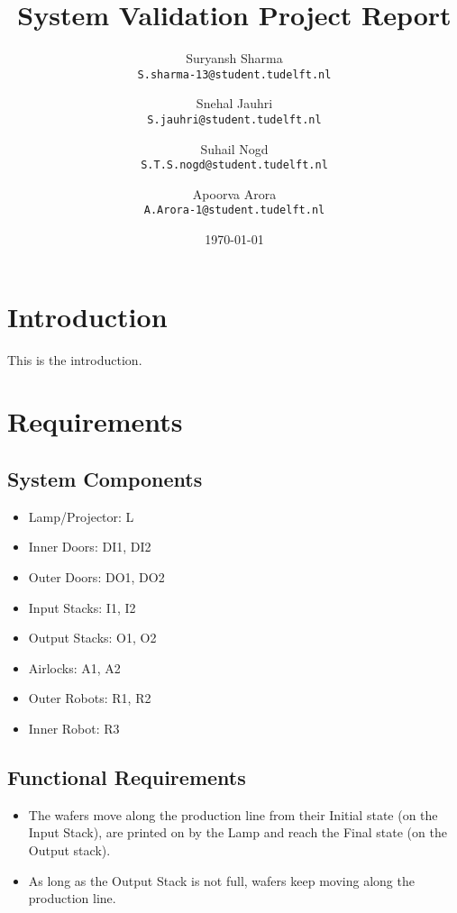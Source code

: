 \documentclass[a4paper,12pt]{article}
\begin{document}
\title{System Validation Project Report}
\author{
	Suryansh Sharma \\ 
	\texttt{S.sharma-13@student.tudelft.nl}
 	\and 
	Snehal Jauhri \\
	\texttt{S.jauhri@student.tudelft.nl} 
	\and
	Suhail Nogd \\
	\texttt{S.T.S.nogd@student.tudelft.nl} 	
	 \and 
	Apoorva Arora\\
	\texttt{A.Arora-1@student.tudelft.nl} 
}

\date {\today}
\maketitle

\section{Introduction}
This is the introduction.

\section{Requirements}

\subsection{System Components}
\begin{itemize}
\item Lamp/Projector: L
\item Inner Doors: DI1, DI2
\item Outer Doors: DO1, DO2
\item Input Stacks: I1, I2
\item Output Stacks: O1, O2
\item Airlocks: A1, A2
\item Outer Robots: R1, R2
\item Inner Robot: R3
\end{itemize}

\subsection{Functional Requirements}
\begin{itemize}
\item The wafers move along the production line from their Initial state (on the Input Stack), are printed on by the Lamp and reach the Final state (on the Output stack).
\item As long as the Output Stack is not full, wafers keep moving along the production line.
\end{itemize}
\end{document}
